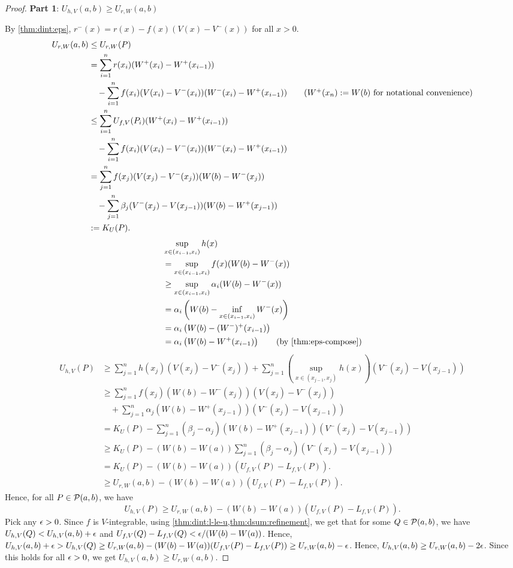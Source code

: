 \documentclass[a4paper,12pt,fleqn]{article}
\begin{document}
\begin{proof}
\textbf{Part 1}: $U_{h,V}(a, b) \ge U_{r,W}(a, b)$

By \cref{thm:dint:eps}, $r^-(x) = r(x) - f(x)(V(x)-V^-(x))$ for all $x > 0$.
\begin{align*}
U_{r,W}(a, b) &\le U_{r,W}(P)
\\ &= \sum_{i=1}^n r(x_i)(W^+(x_i)-W^+(x_{i-1}))
    \\ &\quad - \sum_{i=1}^n f(x_i)(V(x_i)-V^-(x_i))(W^-(x_i)-W^+(x_{i-1}))
        \tag{$W^+(x_n) \defeq W(b)$ for notational convenience}
\\ &\le \sum_{i=1}^n U_{f,V}(P_i)(W^+(x_i)-W^+(x_{i-1}))
    \\ &\quad - \sum_{i=1}^n f(x_i)(V(x_i)-V^-(x_i))(W^-(x_i)-W^+(x_{i-1}))
\\ &= \sum_{j=1}^n f(x_j)(V(x_j)-V^-(x_j))(W(b)-W^-(x_j))
    \\ &\quad - \sum_{j=1}^n \beta_j(V^-(x_j)-V(x_{j-1}))(W(b)-W^+(x_{j-1}))
\\ &\defeq K_U(P).
\end{align*}
\begin{align*}
& \sup_{x \in (x_{i-1}, x_i)} h(x)
\\ &= \sup_{x \in (x_{i-1}, x_i)} f(x)(W(b)-W^-(x))
\\ &\ge \sup_{x \in (x_{i-1}, x_i)} \alpha_i(W(b)-W^-(x))
\\ &= \alpha_i\left(W(b) - \inf_{x \in (x_{i-1}, x_i)} W^-(x)\right)
\\ &= \alpha_i\left(W(b) - (W^-)^+(x_{i-1})\right)
\\ &= \alpha_i\left(W(b) - W^+(x_{i-1})\right)
    \tag{by \cref{thm:eps-compose}}
\end{align*}
\begin{align*}
U_{h,V}(P) &\ge \sum_{j=1}^n h(x_j)(V(x_j)-V^-(x_j))
    + \sum_{j=1}^n \left(\sup_{x \in (x_{j-1}, x_j)} h(x)\right)(V^-(x_j)-V(x_{j-1}))
\\ &\ge \sum_{j=1}^n f(x_j)(W(b)-W^-(x_j))(V(x_j)-V^-(x_j))
    \\ &\quad + \sum_{j=1}^n \alpha_j(W(b)-W^+(x_{j-1}))(V^-(x_j)-V(x_{j-1}))
\\ &= K_U(P) - \sum_{j=1}^n (\beta_j - \alpha_j)(W(b)-W^+(x_{j-1}))(V^-(x_j)-V(x_{j-1}))
\\ &\ge K_U(P) - (W(b)-W(a))\sum_{j=1}^n (\beta_j - \alpha_j)(V^-(x_j)-V(x_{j-1}))
\\ &= K_U(P) - (W(b)-W(a))(U_{f,V}(P) - L_{f,V}(P)).
\\ &\ge U_{r,W}(a, b) - (W(b)-W(a))(U_{f,V}(P) - L_{f,V}(P)).
\end{align*}
Hence, for all $P \in \mathcal{P}(a, b)$, we have
\[ U_{h,V}(P) \ge U_{r,W}(a, b) - (W(b)-W(a))(U_{f,V}(P) - L_{f,V}(P)). \]
Pick any $\epsilon > 0$. Since $f$ is $V$-integrable,
using \cref{thm:dint:l-le-u,thm:dsum:refinement},
we get that for some $Q \in \mathcal{P}(a, b)$, we have
$U_{h,V}(Q) < U_{h,V}(a, b) + \epsilon$ and
$U_{f,V}(Q) - L_{f,V}(Q) < \epsilon/(W(b)-W(a))$.
Hence, $U_{h,V}(a, b) + \epsilon > U_{h,V}(Q) \ge U_{r,W}(a, b) - (W(b)-W(a))(U_{f,V}(P) - L_{f,V}(P))
\ge U_{r,W}(a, b) - \epsilon$.
Hence, $U_{h,V}(a, b) \ge U_{r,W}(a, b) - 2\epsilon$.
Since this holds for all $\epsilon > 0$,
we get $U_{h,V}(a, b) \ge U_{r,W}(a, b)$.


\end{proof}
\end{document}
